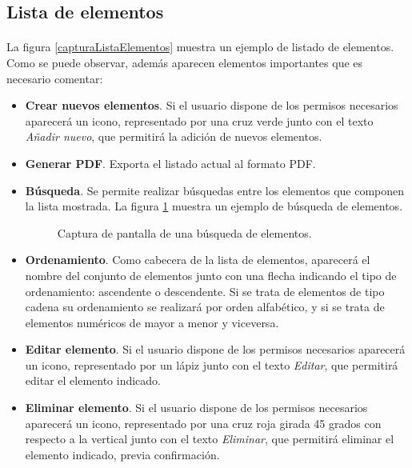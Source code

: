 \subsection{Lista de elementos}

  \paragraph{}La figura \ref{capturaListaElementos} muestra un ejemplo de
  listado de elementos. Como se puede observar, además aparecen elementos
  importantes que es necesario comentar:

  \begin{itemize}
   \item \textbf{Crear nuevos elementos}. Si el usuario dispone de los permisos
   necesarios aparecerá un icono, representado por una cruz verde junto con el
   texto \textit{Añadir nuevo}, que permitirá la adición de nuevos elementos.
   \item \textbf{Generar PDF}. Exporta el listado actual al formato PDF.
   \item \textbf{Búsqueda}. Se permite realizar búsquedas entre los elementos
   que componen la lista mostrada. La figura \ref{capturaBusquedaElementos}
   muestra un ejemplo de búsqueda de elementos.
   \begin{figure}[!ht]
    \begin{center}
      \caption{Captura de pantalla de una búsqueda de elementos.}
      \label{capturaBusquedaElementos}
    \end{center}
  \end{figure}
   \item \textbf{Ordenamiento}. Como cabecera de la lista de elementos,
   aparecerá el nombre del conjunto de elementos junto con una flecha indicando
   el tipo de ordenamiento: ascendente o descendente. Si se trata de elementos
   de tipo cadena su ordenamiento se realizará por orden alfabético, y si se
   trata de elementos numéricos de mayor a menor y viceversa.
   \item \textbf{Editar elemento}. Si el usuario dispone de los permisos
   necesarios aparecerá un icono, representado por un lápiz junto con el texto
   \textit{Editar}, que permitirá editar el elemento indicado.
   \item \textbf{Eliminar elemento}. Si el usuario dispone de los permisos
   necesarios aparecerá un icono, representado por una cruz roja girada 45
   grados con respecto a la vertical junto con el texto \textit{Eliminar}, que
   permitirá eliminar el elemento indicado, previa confirmación.
  \end{itemize}

